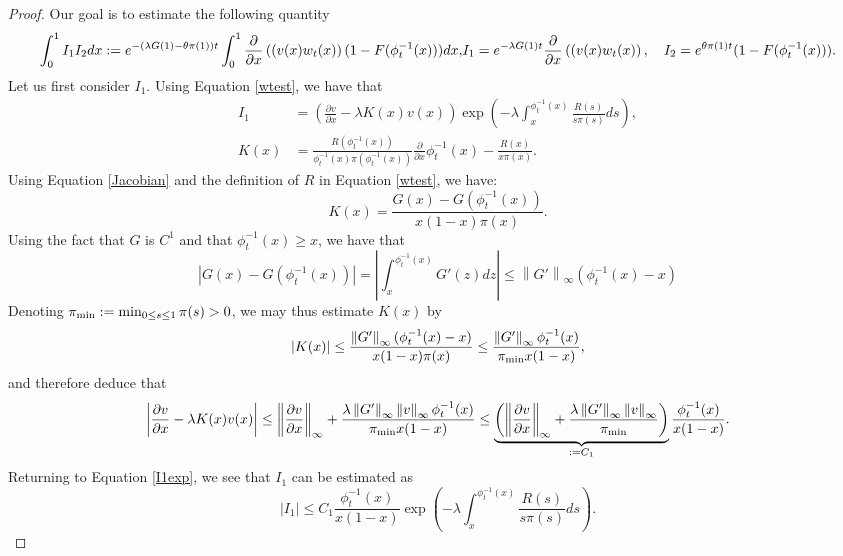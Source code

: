 \documentclass[11pt]{article}
\numberwithin{equation}{section}
\newcommand{\paren}[1]{\left(#1\right)}
\newcommand{\PD}[2]{\frac{\partial#1}{\partial#2}}
\newcommand{\abs}[1]{\left\lvert #1 \right\rvert}
\newcommand{\norm}[1]{\left\lVert #1 \right\rVert}
\begin{document}
{\begin{proof}
Our goal is to estimate the following quantity
\begin{dmath}\label{I1I2}
 {\int_0^1 I_1I_2dx := e^{-(\lambda G(1)-\theta\pi(1))t} \int_0^1\PD{}{x}\paren{(v(x)w_t(x)}(1-F(\phi_t^{-1}(x)))dx,}\\
I_1=e^{-\lambda G(1) t} \PD{}{x}\paren{(v(x)w_t(x)},\quad I_2=e^{\theta \pi(1)t}(1-F(\phi_t^{-1}(x))).
\end{dmath}
Let us first consider $I_1$.
Using Equation \eqref{wtest}, we have that
\begin{equation}\label{I1exp}
\begin{split}
I_1&=\paren{\PD{v}{x}-\lambda K(x) v(x)}\exp\paren{-\lambda \int_x^{\phi_t^{-1}(x)}\frac{R(s)}{s\pi(s)}ds},\\
K(x)&=\frac{R(\phi_t^{-1}(x))}{\phi_t^{-1}(x) \pi(\phi_t^{-1}(x))}\PD{}{x}\phi_t^{-1}(x)-\frac{R(x)}{x\pi(x)}.
\end{split}
\end{equation}
Using Equation \eqref{Jacobian} and the definition of $R$ in Equation \eqref{wtest}, we have:
\begin{equation}\label{Kexp}
K(x)=\frac{G(x)-G(\phi_t^{-1}(x))}{x(1-x)\pi(x)}.
\end{equation}
Using the fact that $G$ is $C^1$ and that $\phi_t^{-1}(x)\geq x$, we have that
\begin{equation}
\abs{G(x)-G(\phi_t^{-1}(x))}=\abs{\int_x^{\phi_t^{-1}(x)} G'(z)dz}\leq \norm{G'}_{\infty}(\phi_t^{-1}(x)-x)
\end{equation}
Denoting $\pi_{\rm min}:=\min_{0\leq s\leq 1} \pi(s)>0$, we may thus estimate $K(x)$ by
\begin{equation}
\abs{K(x)}\leq \frac{\norm{G'}_{\infty}(\phi_t^{-1}(x)-x)}{x(1-x)\pi(x)}\leq \frac{\norm{G'}_{\infty}\phi_t^{-1}(x)}{\pi_{\rm min}x(1-x)},%
%
\end{equation}
and therefore deduce that
\begin{equation}
\abs{\PD{v}{x}-\lambda K(x) v(x)}\leq \norm{\PD{v}{x}}_{\infty}+\frac{\lambda\norm{G'}_{\infty}\norm{v}_{\infty}\phi_t^{-1}(x)}{\pi_{\rm min}x(1-x)} \leq \underbrace{\left(\norm{\PD{v}{x}}_{\infty}+\frac{\lambda\norm{G'}_{\infty}\norm{v}_{\infty}}{\pi_{\rm min}}\right)}_{:= C_1} \frac{\phi_t^{-1}(x)}{x(1-x)}.
\end{equation}
Returning to Equation \eqref{I1exp}, we see that $I_1$ can be estimated as
\begin{equation}\label{I1est}
\abs{I_1}\leq C_1\frac{\phi_t^{-1}(x)}{x(1-x)}\exp\paren{-\lambda \int_x^{\phi_t^{-1}(x)}\frac{R(s)}{s\pi(s)}ds}.

\end{equation}
\end{proof}}
\end{document}
